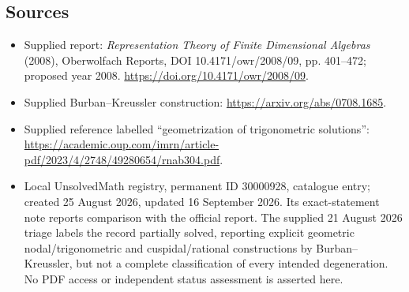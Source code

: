 \documentclass[11pt]{article}
\begin{document}
\subsection{Sources}
\begin{itemize}
\item Supplied report: \emph{Representation Theory of Finite Dimensional Algebras} (2008), Oberwolfach Reports, DOI 10.4171/owr/2008/09, pp. 401--472; proposed year 2008. \url{https://doi.org/10.4171/owr/2008/09}.
\item Supplied Burban--Kreussler construction: \url{https://arxiv.org/abs/0708.1685}.
\item Supplied reference labelled ``geometrization of trigonometric solutions'': \url{https://academic.oup.com/imrn/article-pdf/2023/4/2748/49280654/rnab304.pdf}.
\item Local UnsolvedMath registry, permanent ID 30000928, catalogue entry; created 25 August 2026, updated 16 September 2026. Its exact-statement note reports comparison with the official report. The supplied 21 August 2026 triage labels the record partially solved, reporting explicit geometric nodal/trigonometric and cuspidal/rational constructions by Burban--Kreussler, but not a complete classification of every intended degeneration. No PDF access or independent status assessment is asserted here.
\end{itemize}
\end{document}
